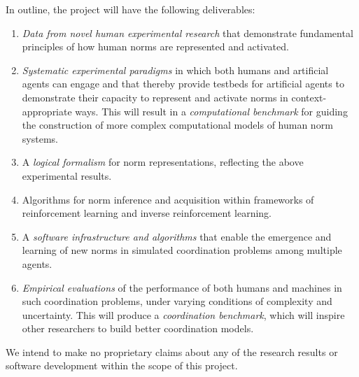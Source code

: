 \documentclass[12pt]{article}
\begin{document}
In outline, the project will have the following deliverables: 
\vspace{-1.5mm}

\begin{enumerate}[label= \arabic*., leftmargin=*,align=left]

\item {\em Data from novel human experimental research} that demonstrate 
fundamental principles of how human norms are represented and activated.
\vspace{-2mm}

\item {\em Systematic experimental paradigms} in which both humans
  and artificial agents can engage and that thereby provide
  testbeds for artificial agents to demonstrate their capacity to
  represent and activate norms in context-appropriate ways. This will
  result in a {\em computational benchmark} for guiding the
  construction of more complex computational models of human norm
  systems.
\vspace{-2mm}

\item A {\em logical formalism} for norm representations, reflecting the above experimental results. 
\vspace{-2mm}

\item Algorithms for norm inference and acquisition within frameworks of reinforcement learning and inverse reinforcement learning. 
\vspace{-2mm}

\item A {\em software infrastructure and algorithms} that enable the
  emergence and learning of new norms in simulated coordination
  problems among multiple agents.
\vspace{-2mm}
\item {\em Empirical evaluations} of the performance of both humans
  and machines in such coordination problems, under varying conditions
  of complexity and uncertainty. This will produce a {\em
    coordination benchmark}, which will inspire other researchers to
  build better coordination models.

\end{enumerate}

\noindent We intend to make no proprietary claims about any of the research
results or software development within the scope of this project.
\vspace{2mm}
\end{document}
